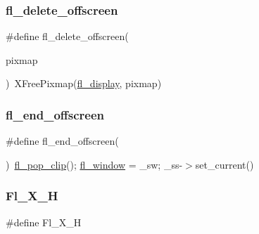 \mbox{\label{x_8_h_a12a5792a2cfdb5b4f46e0b5b5ef67cf5}} 
\subsubsection{\texorpdfstring{fl\+\_\+delete\+\_\+offscreen}{fl\_delete\_offscreen}}
{\footnotesize\ttfamily \#define fl\+\_\+delete\+\_\+offscreen(\begin{DoxyParamCaption}\item[{}]{pixmap }\end{DoxyParamCaption})~X\+Free\+Pixmap(\hyperlink{x_8_h_ae4842a1fc7d2d7b95afeaba5611fc426}{fl\+\_\+display}, pixmap)}

\mbox{\label{x_8_h_a51101df672706fe822b8c913e8e4f588}} 
\subsubsection{\texorpdfstring{fl\+\_\+end\+\_\+offscreen}{fl\_end\_offscreen}}
{\footnotesize\ttfamily \#define fl\+\_\+end\+\_\+offscreen(\begin{DoxyParamCaption}{ }\end{DoxyParamCaption})~\hyperlink{group__fl__drawings_ga7abb216a9a87408c8926126cc9efce22}{fl\+\_\+pop\+\_\+clip}(); \hyperlink{x_8_h_afdab6664143864c36ba6b51782b32500}{fl\+\_\+window} = \+\_\+sw; \+\_\+ss-\/$>$set\+\_\+current()}

\mbox{\label{x_8_h_ad8edb41ff822d7ac6de0cc3902f24489}} 
\subsubsection{\texorpdfstring{Fl\+\_\+\+X\+\_\+H}{Fl\_X\_H}}
{\footnotesize\ttfamily \#define Fl\+\_\+\+X\+\_\+H}

\mbox{\label{x_8_h_a0b95b4c3159c51c43ec553b1959d5b75}} 
